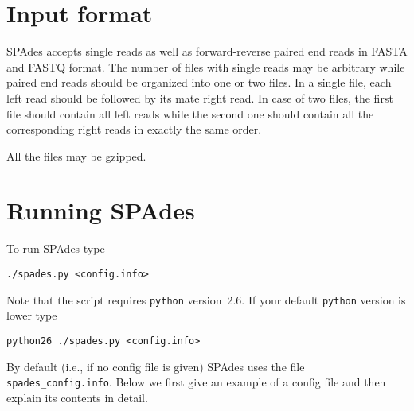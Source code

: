 \documentclass{article}
\def\spades{SPAdes}
\begin{document}
\section{Input format}
{\spades} accepts single reads as well as forward-reverse paired end reads
in FASTA{} and FASTQ format. The number of files with single reads may be arbitrary while paired end reads should be organized into one or two files. In a single file, each left read should be followed by its mate right read. In case of two files, the first file should contain all left reads while
the second one should contain all the corresponding right reads in exactly the same order.

All the files may be gzipped.




\section{Running {\spades}}\label{sec:running}
To run {\spades} type
\begin{lstlisting}
./spades.py <config.info>
\end{lstlisting}
Note that the script requires {\tt python} version~2.6.
If your default {\tt python} version is lower  type
\begin{lstlisting}
python26 ./spades.py <config.info>
\end{lstlisting}
By default (i.e., if no config file is given) {\spades} uses the file {\tt spades\_config.info}. 
Below we first give an example of a config file
and then explain its contents in detail.
\end{document}
